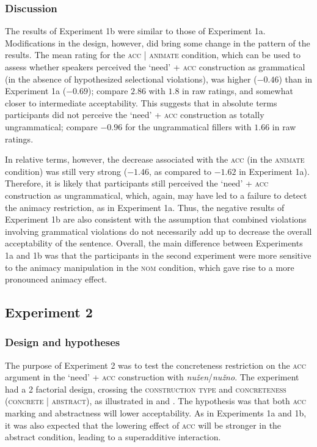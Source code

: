 \documentclass[output=paper,colorlinks,citecolor=brown]{langscibook}
\begin{document}
\subsubsection{Discussion}

The results of Experiment 1b were similar to those of Experiment 1a. Modifications in the design, however, did bring some change in the pattern of the results. The mean rating for the \textsc{acc} | \textsc{animate} condition, which can be used to assess whether speakers perceived the `need' + \textsc{acc} construction as grammatical (in the absence of hypothesized selectional violations), was higher ($-0.46$) than in Experiment 1a ($-0.69$); compare $2.86$ with $1.8$ in raw ratings, and somewhat closer to intermediate acceptability. This suggests that in absolute terms participants did not perceive the `need' + \textsc{acc} construction as totally ungrammatical; compare $-0.96$ for the ungrammatical fillers with $1.66$ in raw ratings.

In relative terms, however, the decrease associated with the \textsc{acc} (in the \textsc{animate} condition) was still very strong ($-1.46$, as compared to $-1.62$ in Experiment 1a). Therefore, it is likely that participants still perceived the `need' + \textsc{acc} construction as ungrammatical, which, again, may have led to a failure to detect the animacy restriction, as in Experiment 1a. Thus, the negative results of Experiment 1b are also consistent with the assumption that combined violations involving grammatical violations do not necessarily add up to decrease the overall acceptability of the sentence. Overall, the main difference between Experiments 1a and 1b was that the participants in the second experiment were more sensitive to the animacy manipulation in the \textsc{nom} condition, which gave rise to a more pronounced animacy effect.

\subsection{Experiment 2}

\subsubsection{Design and hypotheses}

The purpose of Experiment 2 was to test the concreteness restriction on the \textsc{acc} argument in the `need' + \textsc{acc} construction with \textit{nužen}/\textit{nužno}. The experiment had a 2 factorial design, crossing the \textsc{construction type} and \textsc{concreteness} (\textsc{concrete} | \textsc{abstract}), as illustrated in  and . The hypothesis was that both \textsc{acc} marking and abstractness will lower acceptability. As in Experiments 1a and 1b, it was also expected that the lowering effect of \textsc{acc} will be stronger in the abstract condition, leading to a superadditive interaction.
\end{document}
